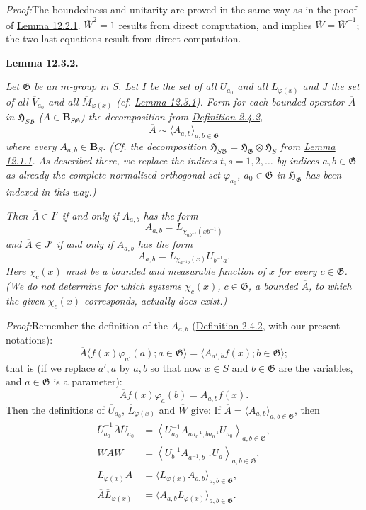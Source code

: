\documentclass[12pt,b5paper,twoside]{article}
\newcommand{\Hspace}{\mathfrak H}
\newcommand{\B}{\mathbf B}
\newcommand{\Lemma}[1]{%
  \par\smallskip\noindent\phantomsection\label{lem:#1}\textbf{Lemma #1.}\enspace
}
\newcommand{\Proof}{\par\noindent\textit{Proof:}\enspace}
\newcommand{\defref}[1]{\hyperref[def:#1]{Definition #1}}
\newcommand{\lemref}[1]{\hyperref[lem:#1]{Lemma #1}}
\begin{document}
\Proof The boundedness and unitarity are proved in the same way as in the
proof of \lemref{12.2.1}. $\overline W^2=1$ results from direct computation,
and implies $\overline W=\overline W^{-1}$; the two last equations result from
direct computation.

\Lemma{12.3.2}
\emph{Let $\mathfrak G$ be an $m$-group in $S$. Let $I$ be the set of all
$\overline U_{a_0}$ and all $\overline L_{\varphi(x)}$ and $J$ the set of all
$\overline V_{a_0}$ and all $\overline M_{\varphi(x)}$
(cf. \lemref{12.3.1}). Form for each bounded operator $\overline A$ in
$\Hspace_{S\mathfrak G}$ ($A\in\B_{S\mathfrak G}$) the decomposition from
\defref{2.4.2},}
\[
 \overline A\sim\langle A_{a,b}\rangle_{a,b\in\mathfrak G}
\]
\emph{where every $A_{a,b}\in\B_S$. (Cf. the decomposition
$\Hspace_{S\mathfrak G}=\Hspace_{\mathfrak G}\otimes\Hspace_S$ from
\lemref{12.1.1}. As described there, we replace the indices
$t,s=1,2,\ldots$ by indices $a,b\in\mathfrak G$ as already the complete
normalised orthogonal set $\varphi_{a_0}$, $a_0\in\mathfrak G$ in
$\Hspace_{\mathfrak G}$ has been indexed in this way.)}

\emph{Then $\overline A\in I'$ if and only if $A_{a,b}$ has the form}
\[
 A_{a,b}=L_{\chi_{ab^{-1}}(xb^{-1})}
\]
\emph{and $\overline A\in J'$ if and only if $A_{a,b}$ has the form}
\[
 A_{a,b}=L_{\chi_{a^{-1}b}(x)}U_{b^{-1}a}.
\]
\emph{Here $\chi_c(x)$ must be a bounded and measurable function of $x$ for
every $c\in\mathfrak G$. (We do not determine for which systems
$\chi_c(x)$, $c\in\mathfrak G$, a bounded $\overline A$, to which the given
$\chi_c(x)$ corresponds, actually does exist.)}

\Proof Remember the definition of the $A_{a,b}$ (\defref{2.4.2}, with our
present notations):
\[
 \overline A\langle f(x)\varphi_{a'}(a);a\in\mathfrak G\rangle
 =\langle A_{a',b}f(x);b\in\mathfrak G\rangle;
\]
that is (if we replace $a',a$ by $a,b$ so that now $x\in S$ and
$b\in\mathfrak G$ are the variables, and $a\in\mathfrak G$ is a parameter):
\[
 \overline Af(x)\varphi_a(b)=A_{a,b}f(x).
\]
Then the definitions of $\overline U_{a_0}$,
$\overline L_{\varphi(x)}$ and $\overline W$ give: If
$\overline A=\langle A_{a,b}\rangle_{a,b\in\mathfrak G}$, then
\begin{align*}
 \overline U_{a_0}^{-1}\overline A\overline U_{a_0}
 &=\left\langle
 U_{a_0}^{-1}A_{aa_0^{-1},ba_0^{-1}}U_{a_0}
 \right\rangle_{a,b\in\mathfrak G},\\
 \overline W\overline A\overline W
 &=\left\langle U_b^{-1}A_{a^{-1},b^{-1}}U_a
 \right\rangle_{a,b\in\mathfrak G},\\
 \overline L_{\varphi(x)}\overline A
 &=\langle L_{\varphi(x)}A_{a,b}\rangle_{a,b\in\mathfrak G},\\
 \overline A\overline L_{\varphi(x)}
 &=\langle A_{a,b}L_{\varphi(x)}\rangle_{a,b\in\mathfrak G}.
\end{align*}
\end{document}
